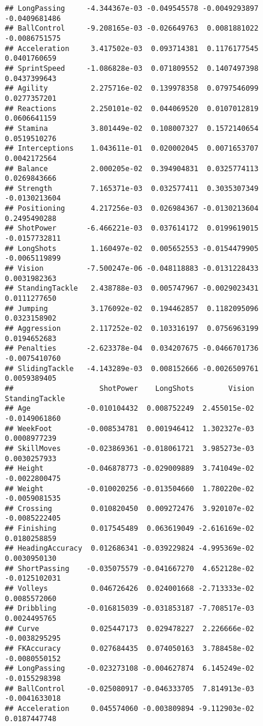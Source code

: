 \documentclass[
]{article}
\begin{document}
\begin{verbatim}
## LongPassing     -4.344367e-03 -0.049545578 -0.0049293897 -0.0409681486
## BallControl     -9.208165e-03 -0.026649763  0.0081881022 -0.0086751575
## Acceleration     3.417502e-03  0.093714381  0.1176177545  0.0401760659
## SprintSpeed     -1.086828e-03  0.071809552  0.1407497398  0.0437399643
## Agility          2.275716e-02  0.139978358  0.0797546099  0.0277357201
## Reactions        2.250101e-02  0.044069520  0.0107012819  0.0606641159
## Stamina          3.801449e-02  0.108007327  0.1572140654  0.0519510276
## Interceptions    1.043611e-01  0.020002045  0.0071653707  0.0042172564
## Balance          2.000205e-02  0.394904831  0.0325774113  0.0269843666
## Strength         7.165371e-03  0.032577411  0.3035307349 -0.0130213604
## Positioning      4.217256e-03  0.026984367 -0.0130213604  0.2495490288
## ShotPower       -6.466221e-03  0.037614172  0.0199619015 -0.0157732811
## LongShots        1.160497e-02  0.005652553 -0.0154479905 -0.0065119899
## Vision          -7.500247e-06 -0.048118883 -0.0131228433  0.0031982363
## StandingTackle   2.438788e-03  0.005747967 -0.0029023431  0.0111277650
## Jumping          3.176092e-02  0.194462857  0.1182095096  0.0323158902
## Aggression       2.117252e-02  0.103316197  0.0756963199  0.0194652683
## Penalties       -2.623378e-04  0.034207675 -0.0466701736 -0.0075410760
## SlidingTackle   -4.143289e-03  0.008152666 -0.0026509761  0.0059389405
##                    ShotPower    LongShots        Vision StandingTackle
## Age             -0.010104432  0.008752249  2.455015e-02  -0.0149061860
## WeekFoot        -0.008534781  0.001946412  1.302327e-03   0.0008977239
## SkillMoves      -0.023869361 -0.018061721  3.985273e-03   0.0030257933
## Height          -0.046878773 -0.029009889  3.741049e-02  -0.0022800475
## Weight          -0.010020256 -0.013504660  1.780220e-02  -0.0059081535
## Crossing         0.010820450  0.009272476  3.920107e-02  -0.0085222405
## Finishing        0.017545489  0.063619049 -2.616169e-02   0.0180258859
## HeadingAccuracy  0.012686341 -0.039229824 -4.995369e-02   0.0030950130
## ShortPassing    -0.035075579 -0.041667270  4.652128e-02  -0.0125102031
## Volleys          0.046726426  0.024001668 -2.713333e-02   0.0085572060
## Dribbling       -0.016815039 -0.031853187 -7.708517e-03   0.0024495765
## Curve            0.025447173  0.029478227  2.226666e-02  -0.0038295295
## FKAccuracy       0.027684435  0.074050163  3.788458e-02  -0.0080550152
## LongPassing     -0.023273108 -0.004627874  6.145249e-02  -0.0155298398
## BallControl     -0.025080917 -0.046333705  7.814913e-03  -0.0041633018
## Acceleration     0.045574060 -0.003809894 -9.112903e-02   0.0187447748

\end{verbatim}
\end{document}
